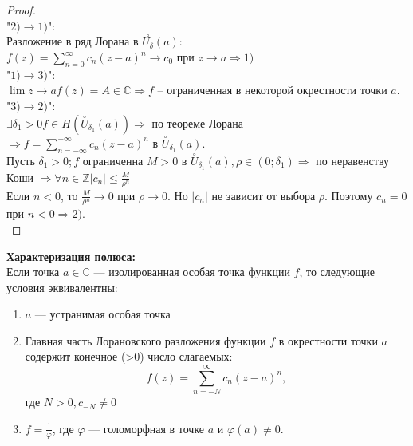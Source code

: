 \begin{proof}
    \ \\
    "$2)\to 1)$":\\
    Разложение в ряд Лорана в $\overset{\circ}{U_{\delta}}(a):$\\
    $f(z)=\sum_{n=0}^\infty c_n(z-a)^n \to c_0$ при $z\to a \Rightarrow 1)$\\[2mm]
    "$1) \to 3)$":\\
    $\lim\limits{z\to a}f(z)=A\in\mathbb{C} \Rightarrow f$ -- ограниченная в некоторой окрестности точки $a$.\\[2mm]
    "$3) \to 2) $":\\
    $\exists \delta_1 >0 f\in H(\overset{\circ}{U}_{\delta_1}(a)) \Rightarrow$ по теореме Лорана\\
    $\Rightarrow f=\sum_{n=-\infty}^{+\infty}c_n(z-a)^n$ в $\overset{\circ}{U}_{\delta_1}(a).$\\
    Пусть $\delta_1 > 0; f$ ограниченна $M>0$ в $\overset{\circ}{U}_{\delta_1}(a), \rho \in (0; \delta_1)\Rightarrow$ по неравенству Коши $\Rightarrow \forall n\in\mathbb{Z} |c_n|\leq \frac{M}{\rho^n}$\\
    Если $n<0$, то $\frac{M}{\rho^n} \to 0$ при $\rho \to 0$. Но $|c_n|$ не зависит от выбора $\rho$. Поэтому $c_n = 0$ при $n<0 \Rightarrow 2)$.\\[2mm]
\end{proof}

\textbf{Характеризация полюса:}\\
Если точка $a\in \mathbb{C}$ --- изолированная особая точка функции $f$, то следующие условия эквивалентны:
\begin{enumerate}
    \item $a$ --- устранимая особая точка
    \item Главная часть Лорановского разложения функции $f$ в окрестности точки $a$ содержит конечное (>0) число слагаемых:
    $$f(z)=\sum_{n=-N}^\infty c_n(z-a)^n,$$
    где $N>0, c_{-N}\neq 0$ 
    \item $f=\frac{1}{\varphi}$, где $\varphi$ --- голоморфная в точке $a$ и $\varphi(a)\neq 0$.
\end{enumerate}

